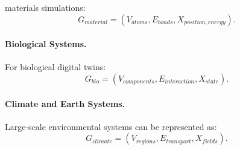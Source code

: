 materials simulations: \begin{equation} G_{material} = (V_{atoms},E_{bonds},X_{position,energy}). \end{equation} \paragraph{Biological Systems.} For biological digital twins: \begin{equation} G_{bio} = (V_{components},E_{interaction},X_{state}). \end{equation} \paragraph{Climate and Earth Systems.} Large-scale environmental systems can be represented as: \begin{equation} G_{climate} = (V_{regions},E_{transport},X_{fields}). \end{equation} %